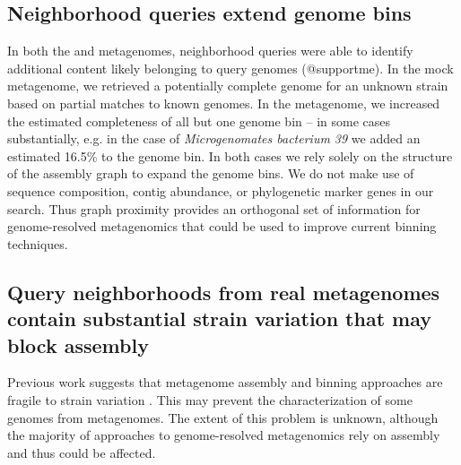 %
%
%

\subsection*{Neighborhood queries extend genome bins}

In both the \podarv and \hu metagenomes, neighborhood queries were
able to identify additional content likely belonging to query genomes (@supportme).
In the \podarv mock metagenome, we retrieved a potentially complete
genome for an unknown strain based on partial matches to known
genomes. In the \hu metagenome, we increased the estimated
completeness of all but one genome bin -- in some cases substantially,
e.g. in the case of {\em Microgenomates bacterium 39}
we added an estimated 16.5\% to the genome bin.  In both cases we rely
solely on the structure of the assembly graph to expand the genome
bins. We do not make use of sequence composition, contig abundance, or
phylogenetic marker genes in our search. Thus graph proximity provides
an orthogonal set of information for genome-resolved metagenomics that
could be used to improve current binning techniques.

\subsection*{Query neighborhoods from real metagenomes contain substantial strain variation that may block assembly}

Previous work suggests that metagenome assembly and binning
approaches are fragile to strain variation \cite{CAMI,Awad155358}. This may
prevent the characterization of some genomes from metagenomes.  The extent of this problem is unknown, although
the majority of approaches to genome-resolved metagenomics rely on
assembly and thus could be affected.

